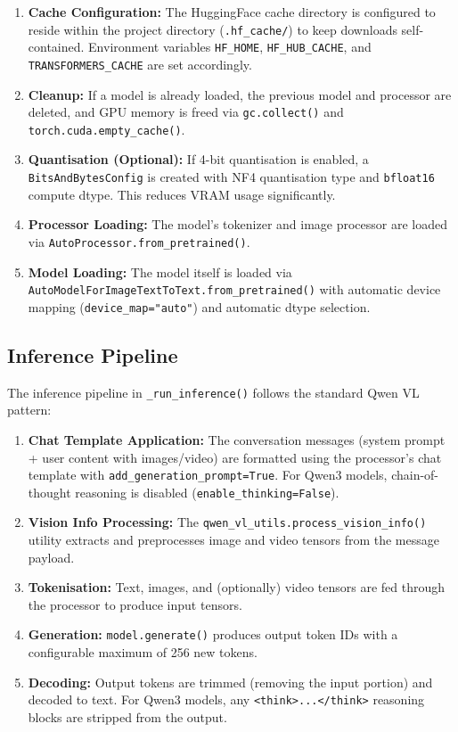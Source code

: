 \documentclass[12pt,a4paper]{article}
\begin{document}
\begin{enumerate}
    \item \textbf{Cache Configuration:} The HuggingFace cache directory is configured to reside within the project directory (\texttt{.hf\_cache/}) to keep downloads self-contained. Environment variables \texttt{HF\_HOME}, \texttt{HF\_HUB\_CACHE}, and \texttt{TRANSFORMERS\_CACHE} are set accordingly.
    \item \textbf{Cleanup:} If a model is already loaded, the previous model and processor are deleted, and GPU memory is freed via \texttt{gc.collect()} and \texttt{torch.cuda.empty\_cache()}.
    \item \textbf{Quantisation (Optional):} If 4-bit quantisation is enabled, a \texttt{BitsAndBytesConfig} is created with NF4 quantisation type and \texttt{bfloat16} compute dtype. This reduces VRAM usage significantly.
    \item \textbf{Processor Loading:} The model's tokenizer and image processor are loaded via \texttt{AutoProcessor.from\_pretrained()}.
    \item \textbf{Model Loading:} The model itself is loaded via \texttt{AutoModelForImageTextToText.from\_pretrained()} with automatic device mapping (\texttt{device\_map="auto"}) and automatic dtype selection.
\end{enumerate}

\subsection{Inference Pipeline}

The inference pipeline in \texttt{\_run\_inference()} follows the standard Qwen VL pattern:

\begin{enumerate}
    \item \textbf{Chat Template Application:} The conversation messages (system prompt + user content with images/video) are formatted using the processor's chat template with \texttt{add\_generation\_prompt=True}. For Qwen3 models, chain-of-thought reasoning is disabled (\texttt{enable\_thinking=False}).
    \item \textbf{Vision Info Processing:} The \texttt{qwen\_vl\_utils.process\_vision\_info()} utility extracts and preprocesses image and video tensors from the message payload.
    \item \textbf{Tokenisation:} Text, images, and (optionally) video tensors are fed through the processor to produce input tensors.
    \item \textbf{Generation:} \texttt{model.generate()} produces output token IDs with a configurable maximum of 256 new tokens.
    \item \textbf{Decoding:} Output tokens are trimmed (removing the input portion) and decoded to text. For Qwen3 models, any \texttt{<think>...</think>} reasoning blocks are stripped from the output.
\end{enumerate}
\end{document}
